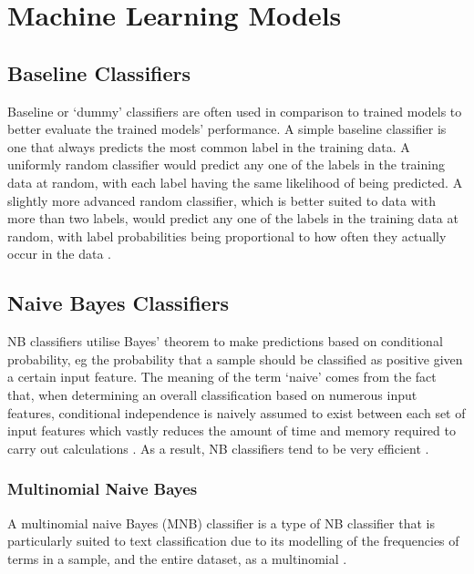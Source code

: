\section{Machine Learning Models}

\subsection{Baseline Classifiers}

Baseline or `dummy' classifiers are often used in comparison to trained models to better evaluate the trained models' performance. A simple baseline classifier is one that always predicts the most common label in the training data. A uniformly random classifier would predict any one of the labels in the training data at random, with each label having the same likelihood of being predicted. A slightly more advanced random classifier, which is better suited to data with more than two labels, would predict any one of the labels in the training data at random, with label probabilities being proportional to how often they actually occur in the data \cite{pedregosa2011scikit}.

\subsection{Naive Bayes Classifiers}

NB classifiers utilise Bayes' theorem to make predictions based on conditional probability, eg the probability that a sample should be classified as positive given a certain input feature. The meaning of the term `naive' comes from the fact that, when determining an overall classification based on numerous input features, conditional independence is naively assumed to exist between each set of input features which vastly reduces the amount of time and memory required to carry out calculations \cite{dangeti2017statistics}. As a result, NB classifiers tend to be very efficient \cite{pedregosa2011scikit}.

\subsubsection{Multinomial Naive Bayes}

A multinomial naive Bayes (MNB) classifier is a type of NB classifier that is particularly suited to text classification due to its modelling of the frequencies of terms in a sample, and the entire dataset, as a multinomial \cite{rennie2003tackling}.

